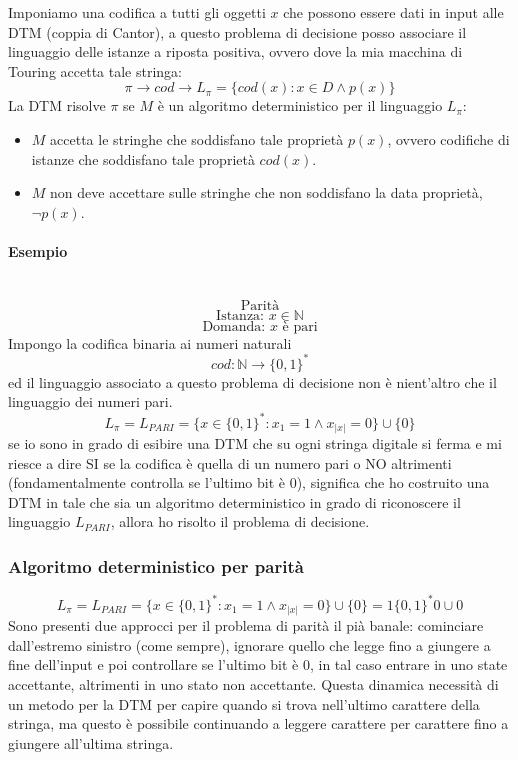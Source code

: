\documentclass{article}
\begin{document}
Imponiamo una codifica a tutti gli oggetti $x$ che possono essere dati in input alle DTM
(coppia di Cantor), a questo problema di decisione posso associare il linguaggio delle istanze
a riposta positiva, ovvero dove la mia macchina di Touring accetta tale stringa:
$$\pi\rightarrow cod\rightarrow L_\pi=\{cod(x):x\in D\land p(x)\}$$
La DTM risolve $\pi$ se $M$ è un algoritmo deterministico per il linguaggio $L_\pi$:
\begin{itemize}
    \item $M$ accetta le stringhe che soddisfano tale proprietà $p(x)$,
    ovvero codifiche di istanze che soddisfano tale proprietà $cod(x)$.
    \item $M$ non deve accettare sulle stringhe che non soddisfano la data proprietà,
     $\lnot p(x)$.
\end{itemize}
\paragraph{Esempio}\mbox{}\\
$$\text{Parità}$$
$$\text{Istanza: }x\in\mathbb{N}$$
$$\text{Domanda: }x\text{ è pari}$$
Impongo la codifica binaria ai numeri naturali
$$cod:\mathbb{N}\rightarrow\{0,1\}^*$$
ed il linguaggio associato a questo problema di decisione non è nient'altro che il linguaggio
dei numeri pari.
$$L_\pi=L_{PARI}=\{x\in\{0,1\}^*:x_1=1\land x_{|x|}=0\}\cup\{0\}$$
se io sono in grado di esibire una DTM che su ogni stringa digitale si ferma e mi riesce a
dire SI se la codifica è quella di un numero pari o NO altrimenti (fondamentalmente
controlla se l'ultimo bit è 0), significa che ho costruito una DTM
in tale che sia un algoritmo deterministico in grado
di riconoscere il linguaggio $L_{PARI}$, allora ho risolto il problema di decisione.

\subsubsection{Algoritmo deterministico per parità}
$$L_\pi=L_{PARI}=\{x\in\{0,1\}^*:x_1=1\land x_{|x|}=0\}\cup\{0\}=1\{0,1\}^*0\cup 0$$
Sono presenti due approcci per il problema di parità il pià banale:
cominciare dall'estremo sinistro (come sempre), ignorare quello che legge
fino a giungere a fine dell'input e poi controllare se l'ultimo bit è 0,
in tal caso entrare in uno state accettante, altrimenti in uno stato
non accettante. Questa dinamica necessità di un metodo per la DTM
per capire quando si trova nell'ultimo carattere della stringa,
ma questo è possibile continuando a leggere carattere per carattere fino a
giungere all'ultima stringa.
\end{document}
